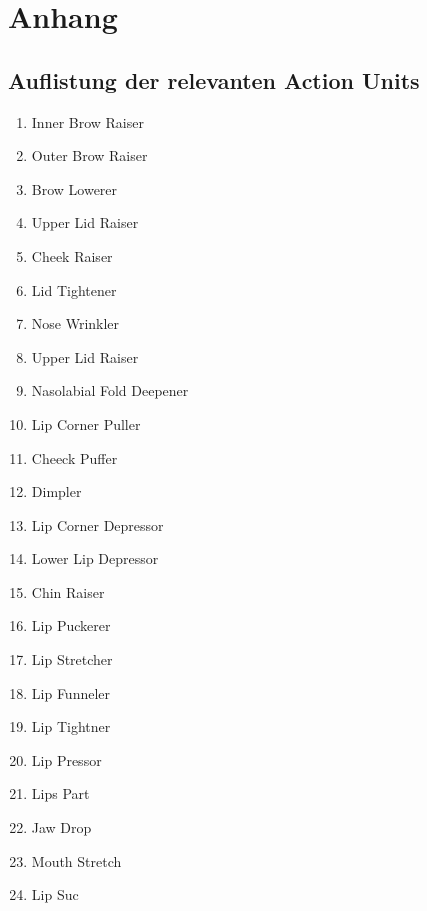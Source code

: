 \chapter{Anhang}

\section{Auflistung der relevanten Action Units}\label{Anhang.AUs}
\begin{enumerate}
    \item{Inner Brow Raiser}
    \item{Outer Brow Raiser}
    \item{Brow Lowerer}
    \item{Upper Lid Raiser}
    \item{Cheek Raiser}
    \item{Lid Tightener}
    \item{Nose Wrinkler}
    \item{Upper Lid Raiser}
    \item{Nasolabial Fold Deepener}
    \item{Lip Corner Puller}
    \item{Cheeck Puffer}
    \item{Dimpler}
    \item{Lip Corner Depressor}
    \item{Lower Lip Depressor}
    \item{Chin Raiser}
    \item{Lip Puckerer}
    \item{Lip Stretcher}
    \item{Lip Funneler}
    \item{Lip Tightner}
    \item{Lip Pressor}
    \item{Lips Part}
    \item{Jaw Drop}
    \item{Mouth Stretch}
    \item{Lip Suc}
\end{enumerate}